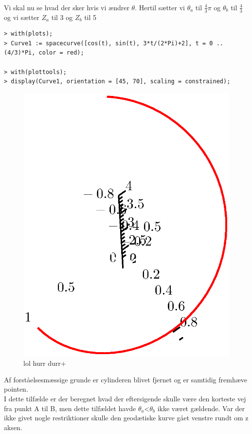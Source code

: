 \\
\\
\\
Vi skal nu se hvad der sker hvis vi ændrer $\theta$. Hertil sætter vi $\theta_a$ til $\frac{4}{3} \pi$ og $\theta_b$ til $\frac{4}{3}$ og vi sætter $Z_a$ til 3 og $Z_b$ til 5
\begin{lstlisting}
> with(plots);
> Curve1 := spacecurve([cos(t), sin(t), 3*t/(2*Pi)+2], t = 0 .. (4/3)*Pi, color = red);

> with(plottools);
> display(Curve1, orientation = [45, 70], scaling = constrained);
\end{lstlisting}
\begin{figure}
\center
\includegraphics[scale=0.4]{pictures/Opg8_Fig3.eps}
\caption{lol hurr durr+}
\end{figure}
Af forståelsesmæssige grunde er cylinderen blivet fjernet og er samtidig fremhæve pointen.
\\
I dette tilfælde er der beregnet hvad der eftersigende skulle være den korteste vej fra punkt A til B, men dette tilfældet havde $\theta_a$<$\theta_b$ ikke været gældende. Var der ikke givet nogle restriktioner skulle den geodætiske kurve gået venstre rundt om z aksen.
